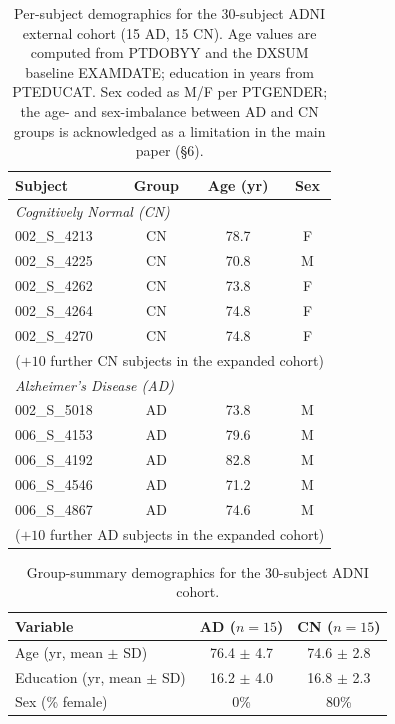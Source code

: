 \documentclass[10pt,a4paper]{article}
\begin{document}
\begin{table}[!ht]
\caption{Per-subject demographics for the 30-subject ADNI external
cohort (15 AD, 15 CN). Age values are computed from PTDOBYY and the
DXSUM baseline EXAMDATE; education in years from PTEDUCAT.
Sex coded as M/F per PTGENDER; the age- and sex-imbalance between AD
and CN groups is acknowledged as a limitation in the main paper
(\S6).}
\centering
\small
\begin{tabular}{lccc}
\toprule
Subject & Group & Age (yr) & Sex \\
\midrule
\multicolumn{4}{l}{\emph{Cognitively Normal (CN)}} \\
002\_S\_4213 & CN & 78.7 & F \\
002\_S\_4225 & CN & 70.8 & M \\
002\_S\_4262 & CN & 73.8 & F \\
002\_S\_4264 & CN & 74.8 & F \\
002\_S\_4270 & CN & 74.8 & F \\
\multicolumn{4}{c}{($+10$ further CN subjects in the expanded cohort)} \\
\midrule
\multicolumn{4}{l}{\emph{Alzheimer's Disease (AD)}} \\
002\_S\_5018 & AD & 73.8 & M \\
006\_S\_4153 & AD & 79.6 & M \\
006\_S\_4192 & AD & 82.8 & M \\
006\_S\_4546 & AD & 71.2 & M \\
006\_S\_4867 & AD & 74.6 & M \\
\multicolumn{4}{c}{($+10$ further AD subjects in the expanded cohort)} \\
\bottomrule
\end{tabular}
\end{table}

\begin{table}[!ht]
\caption{Group-summary demographics for the 30-subject ADNI cohort.}
\centering
\small
\begin{tabular}{lcc}
\toprule
Variable & AD ($n=15$) & CN ($n=15$) \\
\midrule
Age (yr, mean $\pm$ SD)    & 76.4 $\pm$ 4.7 & 74.6 $\pm$ 2.8 \\
Education (yr, mean $\pm$ SD) & 16.2 $\pm$ 4.0 & 16.8 $\pm$ 2.3 \\
Sex (\% female)            & 0\%            & 80\%           \\
\bottomrule
\end{tabular}
\end{table}
\end{document}
